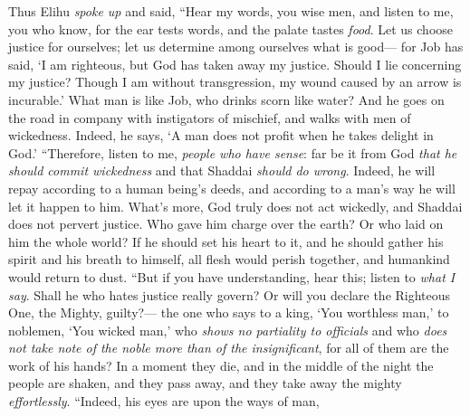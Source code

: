 \begin{biblechapter} %
 Thus Elihu \textit{spoke up} and said,
\verse “Hear my words, you wise men, 
and listen to me, you who know,
\verse for the ear tests words, 
and the palate tastes \textit{food}.
\verse Let us choose justice for ourselves; 
let us determine among ourselves what is good—
\verse for Job has said, ‘I am righteous, 
but God has taken away my justice.
\verse Should I lie concerning my justice? 
Though I am without transgression, my wound caused by an arrow is incurable.’
\verse What man is like Job, 
who drinks scorn like water?
\verse And he goes on the road in company with instigators of mischief, 
and walks with men of wickedness.
\verse Indeed, he says, ‘A man does not profit 
when he takes delight in God.’
\verse “Therefore, listen to me, \textit{people who have sense}: 
far be it from God \textit{that he should commit wickedness} 
and that Shaddai \textit{should do wrong}.
\verse Indeed, he will repay according to a human being’s deeds, 
and according to a man’s way he will let it happen to him.
\verse What’s more, God truly does not act wickedly, 
and Shaddai does not pervert justice.
\verse Who gave him charge over the earth? 
Or who laid on him the whole world?
\verse If he should set his heart to it, 
and he should gather his spirit and his breath to himself,
\verse all flesh would perish together, 
and humankind would return to dust.
\verse “But if you have understanding, hear this; 
listen to \textit{what I say}.
\verse Shall he who hates justice really govern? 
Or will you declare the Righteous One, the Mighty, guilty?—
\verse the one who says to a king, 
‘You worthless man,’ to noblemen, ‘You wicked man,’
\verse who \textit{shows no partiality to officials} 
and who \textit{does not take note of the noble more than of the insignificant}, 
for all of them are the work of his hands?
\verse In a moment they die, 
and in the middle of the night the people are shaken, and they pass away, 
and they take away the mighty \textit{effortlessly}.
\verse “Indeed, his eyes are upon the ways of man, 

\end{biblechapter}

